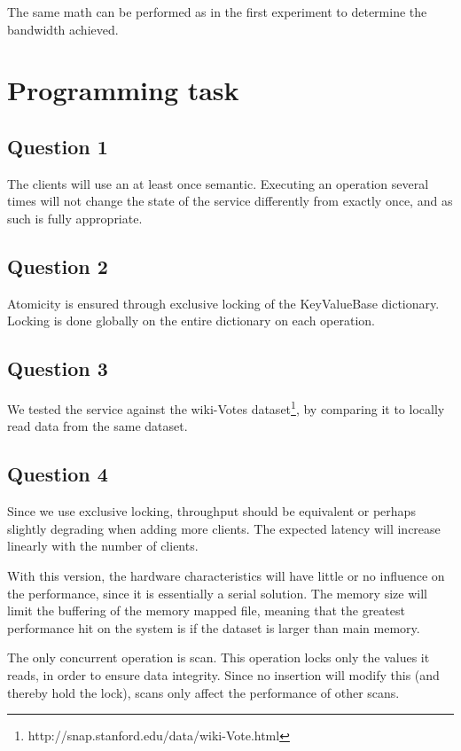 \documentclass[11pt,a4paper]{article}
\begin{document}
The same math can be performed as in the first experiment to determine the
bandwidth achieved.

\section{Programming task}

\subsection{Question 1}
The clients will use an at least once semantic. Executing an operation
several times will not change the state of the service differently from
exactly once, and as such is fully appropriate.

\subsection{Question 2}
Atomicity is ensured through exclusive locking of the KeyValueBase dictionary.
Locking is done globally on the entire dictionary on each operation.

\subsection{Question 3}
We tested the service against the wiki-Votes dataset\footnote{http://snap.stanford.edu/data/wiki-Vote.html},
by comparing it to locally read data from the same dataset.


\subsection{Question 4}
Since we use exclusive locking, throughput should be equivalent or perhaps slightly degrading
when adding more clients. The expected latency will increase linearly with the number of
clients.

With this version, the hardware characteristics will have little or no influence on the
performance, since it is essentially a serial solution. The memory size will limit the
buffering of the memory mapped file, meaning that the greatest performance hit
on the system is if the dataset is larger than main memory.

The only concurrent operation is scan. This operation locks only the values it
reads, in order to ensure data integrity. Since no insertion will modify this
(and thereby hold the lock), scans only affect the performance of other scans.
\end{document}
